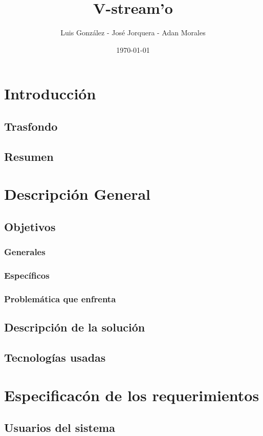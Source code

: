 \documentclass[12pt]{article}
\title{V-stream'o}
\author{Luis González - José Jorquera - Adan Morales}
\date{\today}
\begin{document}
\maketitle
\thispagestyle{empty}

\newpage
\section{Introducción}
\subsection{Trasfondo}
\subsection{Resumen}

\newpage
\section{Descripción General}
\subsection{Objetivos}
\subsubsection{Generales}
\subsubsection{Específicos}
\subsubsection{Problemática que enfrenta}

\subsection{Descripción de la solución}

\subsection{Tecnologías usadas}

\newpage
\section{Especificacón de los requerimientos}
\subsection{Usuarios del sistema}
\end{document}
